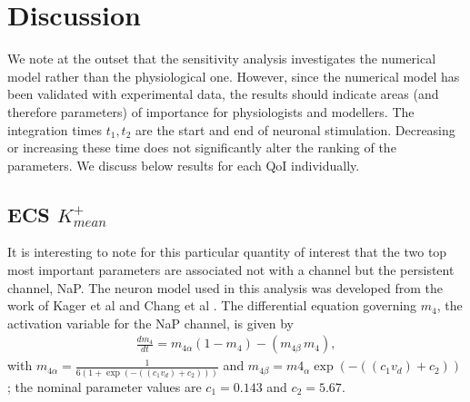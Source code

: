 \section{Discussion}
We  note at the outset that the sensitivity analysis investigates the numerical model rather than the physiological one. However, since the numerical model has been validated with experimental data,  the results should indicate areas (and therefore parameters) of importance for physiologists and modellers. The integration times $t_1,t_2$ are the start and end of neuronal stimulation. Decreasing or increasing these time does not significantly alter the ranking of the parameters. We discuss below results for each QoI individually. 


\subsection{ECS $K^+_{mean}$}
It is interesting to note for this particular quantity of interest that the two top most important parameters are associated not with a \pot channel but the persistent \na channel, NaP.  The neuron model used in this analysis was developed from the work of Kager et al \cite{Kager2000a} and Chang et al \cite{Chang2013}.
The differential equation governing $m_4$,  the activation variable for the NaP channel, is given by 
\begin{eqnarray}
\frac{d m_4}{dt} = m_{4 \alpha}(1 - m_4) - (m_{4\beta} \, m_4), \label{eqn:m4alpha}
\end{eqnarray}
with $\displaystyle m_{4 \alpha}= \frac{1}{6(1 + \exp(-((c_1 v_d) + c_2)))}$ and $m_{4 \beta} = m4_{\alpha} \exp(-((c_1 v_d) + c_2))$; the nominal parameter values are $c_1=0.143$ and $c_2=5.67$.

